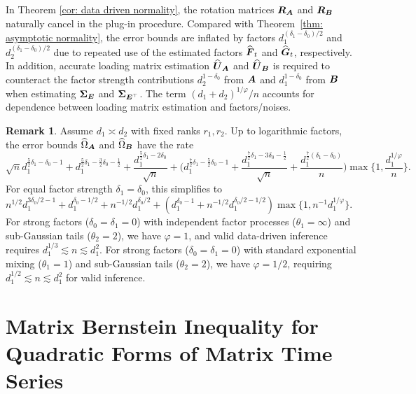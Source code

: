\documentclass[11pt,letterpaper]{article}
\theoremstyle{definition}
\newtheorem{remark}{Remark}
\begin{document}
In Theorem \ref{cor: data driven normality}, the rotation matrices $\boldsymbol{R}_{\boldsymbol{A}}$ and $\boldsymbol{R}_{\boldsymbol{B}}$ naturally cancel in the plug-in procedure. Compared with Theorem~\ref{thm: asymptotic normality}, the error bounds are inflated by factors $d_1^{(\delta_1-\delta_0)/2}$ and $d_2^{(\delta_1-\delta_0)/2}$ due to repeated use of the estimated factors $\widehat{\boldsymbol{F}}_t$ and $\widehat{\boldsymbol{G}}_t$, respectively. In addition, accurate loading matrix estimation $\widehat{\boldsymbol{U}}_{\boldsymbol{A}}$ and $\widehat{\boldsymbol{U}}_{\boldsymbol{B}}$ is required to counteract the factor strength contributions $d_2^{1-\delta_0}$ from $\boldsymbol{A}$ and $d_1^{1-\delta_0}$ from $\boldsymbol{B}$ when estimating $\boldsymbol{\Sigma}_{\boldsymbol{E}}$ and $\boldsymbol{\Sigma}_{\boldsymbol{E}^{\top}}$. The term $(d_1+d_2)^{1/\varphi}/n$ accounts for dependence between loading matrix estimation and factors/noises.

\begin{remark}
Assume $d_1 \asymp d_2 $ with fixed ranks $r_1,r_2$. Up to logarithmic factors, the error bounds $\widehat{\Omega}_{\boldsymbol{A}} $ and $ \widehat{\Omega}_{\boldsymbol{B}} $ have the rate
$$
\sqrt{n} d_1^{\frac{5}{2} \delta_1-\delta_0-1} + d_1^{\frac{5}{2} \delta_1-\frac{3}{2} \delta_0-\frac{1}{2}} + \frac{d_1^{\frac{5}{2} \delta_1-2 \delta_0}}{\sqrt{n}} 
+  \Big(d_1^{\frac{7}{2} \delta_1-\frac{5}{2} \delta_0-1}+\frac{d_1^{\frac{7}{2} \delta_1-3 \delta_0-\frac{1}{2}}}{\sqrt{n}}+\frac{d_1^{\frac{7}{2} (\delta_1-\delta_0 )}}{n} \Big) \max \Big\{1, \frac{ d_1^{1 / \varphi}}{n} \Big\}.
$$
For equal factor strength $\delta_1=\delta_0$, this simplifies to
$n^{1/2} d_1^{3\delta_0/2-1} + d_1^{\delta_0- 1/2} + n ^{-1/2} d_1^{\delta_0/2}
+  (d_1^{ \delta_0-1}+n^{-1/2} d_1^{\delta_0/2-1/2}  ) \max \{1, n^{-1}d_1^{1 / \varphi} \} .$
For strong factors ($\delta_0=\delta_1 = 0$) with independent factor processes ($\theta_1 = \infty$) and sub-Gaussian tails ($\theta_2 = 2$), we have $\varphi = 1$, and valid data-driven inference requires $d_1^{1/3} \lesssim n \lesssim d_1^{2}$. For strong factors ($\delta_0=\delta_1 = 0$) with standard exponential mixing ($\theta_1 = 1$) and sub-Gaussian tails ($\theta_2 = 2$), we have $\varphi = 1/2$, requiring $d_1^{1/2} \lesssim n \lesssim d_1^{2}$ for valid inference. 
\end{remark}




\section{Matrix Bernstein Inequality for Quadratic Forms of Matrix Time Series}\label{sec:ineq}
\end{document}
